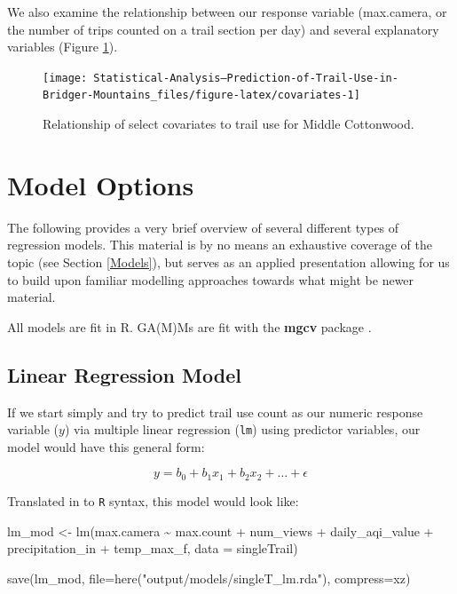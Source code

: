 \documentclass[
]{book}
\newenvironment{Shaded}{\begin{snugshade}}{\end{snugshade}}
\newcommand{\AttributeTok}[1]{\textcolor[rgb]{0.77,0.63,0.00}{#1}}
\newcommand{\FunctionTok}[1]{\textcolor[rgb]{0.00,0.00,0.00}{#1}}
\newcommand{\NormalTok}[1]{#1}
\newcommand{\OtherTok}[1]{\textcolor[rgb]{0.56,0.35,0.01}{#1}}
\newcommand{\SpecialCharTok}[1]{\textcolor[rgb]{0.00,0.00,0.00}{#1}}
\newcommand{\StringTok}[1]{\textcolor[rgb]{0.31,0.60,0.02}{#1}}
\begin{document}
We also examine the relationship between our response variable (max.camera, or the number of trips counted on a trail section per day) and several explanatory variables (Figure \ref{fig:covariates}).

\begin{figure}

{\centering \texttt{[image: Statistical-Analysis--Prediction-of-Trail-Use-in-Bridger-Mountains\_files/figure-latex/covariates-1]} 

}

\caption{Relationship of select covariates to trail use for Middle Cottonwood.}\label{fig:covariates}
\end{figure}

\hypertarget{model-options}{%
\section{Model Options}\label{model-options}}

The following provides a very brief overview of several different types of regression models. This material is by no means an exhaustive coverage of the topic (see Section \ref{Models}), but serves as an applied presentation allowing for us to build upon familiar modelling approaches towards what might be newer material.

All models are fit in R. GA(M)Ms are fit with the \textbf{mgcv} package \citep[\citet{R-Wood2}, \citet{R-Wood3}, \citet{R-Wood4}, \citet{R-Wood5}]{R-Wood1}.

\hypertarget{linear-regression-model-1}{%
\subsection{Linear Regression Model}\label{linear-regression-model-1}}

If we start simply and try to predict trail use count as our numeric response variable (\(y\)) via multiple linear regression (\texttt{lm}) using predictor variables, our model would have this general form:

\[
y = b_0 + b_1x_1 + b_2x_2 + \dots + \epsilon
\]

Translated in to \texttt{R} syntax, this model would look like:

\begin{Shaded}
\begin{Highlighting}[]
\NormalTok{lm\_mod }\OtherTok{\textless{}{-}} \FunctionTok{lm}\NormalTok{(max.camera }\SpecialCharTok{\textasciitilde{}} 
\NormalTok{               max.count }\SpecialCharTok{+} 
\NormalTok{               num\_views }\SpecialCharTok{+}
\NormalTok{               daily\_aqi\_value }\SpecialCharTok{+} 
\NormalTok{               precipitation\_in }\SpecialCharTok{+} 
\NormalTok{               temp\_max\_f, }
             \AttributeTok{data =}\NormalTok{ singleTrail)}

\FunctionTok{save}\NormalTok{(lm\_mod, }
     \AttributeTok{file=}\FunctionTok{here}\NormalTok{(}\StringTok{"output/models/singleT\_lm.rda"}\NormalTok{), }
     \AttributeTok{compress=}\StringTok{\textquotesingle{}xz\textquotesingle{}}\NormalTok{)}
\end{Highlighting}
\end{Shaded}
\end{document}
